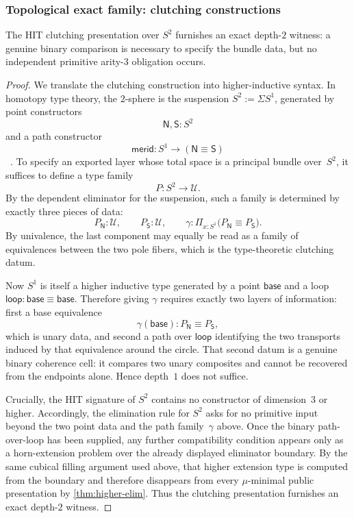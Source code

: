 \documentclass{lmcs}
\newcommand{\U}{\mathcal{U}}
\begin{document}
\subsubsection{Topological exact family: clutching constructions}

\begin{thm}
\label{thm:clutching}
The HIT clutching presentation over $S^2$ furnishes an exact depth-$2$ witness: a genuine binary comparison is necessary to specify the bundle data, but no independent primitive arity-$3$ obligation occurs.
\end{thm}

\begin{proof}
We translate the clutching construction into higher-inductive syntax. In homotopy type theory, the $2$-sphere is the suspension $S^2 := \Sigma S^1$, generated by point constructors
\[
  \mathsf{N}, \mathsf{S} : S^2
\]
and a path constructor
\[
  \mathsf{merid} : S^1 \to (\mathsf{N} \equiv \mathsf{S})
\]
~\cite{hott,cchm-hits}. To specify an exported layer whose total space is a principal bundle over~$S^2$, it suffices to define a type family
\[
  P : S^2 \to \U.
\]
By the dependent eliminator for the suspension, such a family is determined by exactly three pieces of data:
\[
  P_{\mathsf{N}} : \U,
  \qquad
  P_{\mathsf{S}} : \U,
  \qquad
  \gamma : \Pi_{x:S^1} \bigl(P_{\mathsf{N}} \equiv P_{\mathsf{S}}\bigr).
\]
By univalence, the last component may equally be read as a family of equivalences between the two pole fibers, which is the type-theoretic clutching datum.

Now $S^1$ is itself a higher inductive type generated by a point $\mathsf{base}$ and a loop $\mathsf{loop} : \mathsf{base} \equiv \mathsf{base}$. Therefore giving $\gamma$ requires exactly two layers of information: first a base equivalence
\[
  \gamma(\mathsf{base}) : P_{\mathsf{N}} \equiv P_{\mathsf{S}},
\]
which is unary data, and second a path over $\mathsf{loop}$ identifying the two transports induced by that equivalence around the circle. That second datum is a genuine binary coherence cell: it compares two unary composites and cannot be recovered from the endpoints alone. Hence depth~$1$ does not suffice.

Crucially, the HIT signature of $S^2$ contains no constructor of dimension~$3$ or higher. Accordingly, the elimination rule for $S^2$ asks for no primitive input beyond the two point data and the path family~$\gamma$ above. Once the binary path-over-loop has been supplied, any further compatibility condition appears only as a horn-extension problem over the already displayed eliminator boundary. By the same cubical filling argument used above, that higher extension type is computed from the boundary and therefore disappears from every $\mu$-minimal public presentation by \autoref{thm:higher-elim}. Thus the clutching presentation furnishes an exact depth-$2$ witness.
\end{proof}
\end{document}
